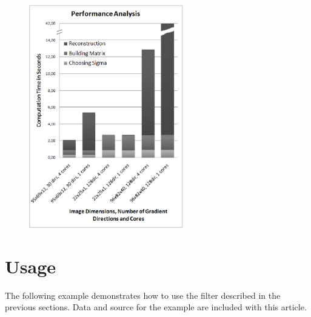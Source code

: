 \documentclass{InsightArticle}
\begin{document}
\begin{figure}
\center
\includegraphics[width=0.6\textwidth]{PerformanceAnalysis.eps}
\label{fig:PerformanceAnalysis}
\end{figure}

\section{Usage }
The following example demonstrates how to use the filter described in the previous sections. Data and source for the example are included with this article.
\end{document}

